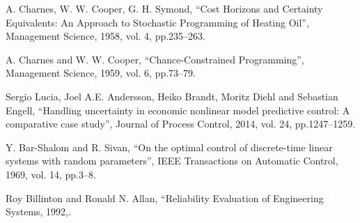 \documentclass[conference]{IEEEtran}
\begin{document}
\begin{thebibliography}{00}
 A. Charnes, W. W. Cooper, G. H. Symond, ``Cost Horizons and Certainty Equivalents: An Approach to Stochastic Programming of Heating Oil'', Management Science, 1958, vol. 4, pp.235--263.

 A. Charnes and W. W. Cooper, ``Chance-Constrained Programming'', Management Science, 1959, vol. 6, pp.73--79.


 Sergio Lucia, Joel A.E. Andersson, Heiko Brandt, Moritz Diehl and Sebastian Engell, ``Handling uncertainty in economic nonlinear model predictive control: A comparative case study'', Journal of Process Control, 2014, vol. 24, pp.1247--1259.

 Y. {Bar-Shalom} and R. {Sivan}, ``On the optimal control of discrete-time linear systems with random parameters'', IEEE Transactions on Automatic Control, 1969, vol. 14, pp.3--8.

 Roy Billinton and Ronald N. Allan, ``Reliability Evaluation of Engineering Systems, 1992,.

\end{thebibliography}
\end{document}
